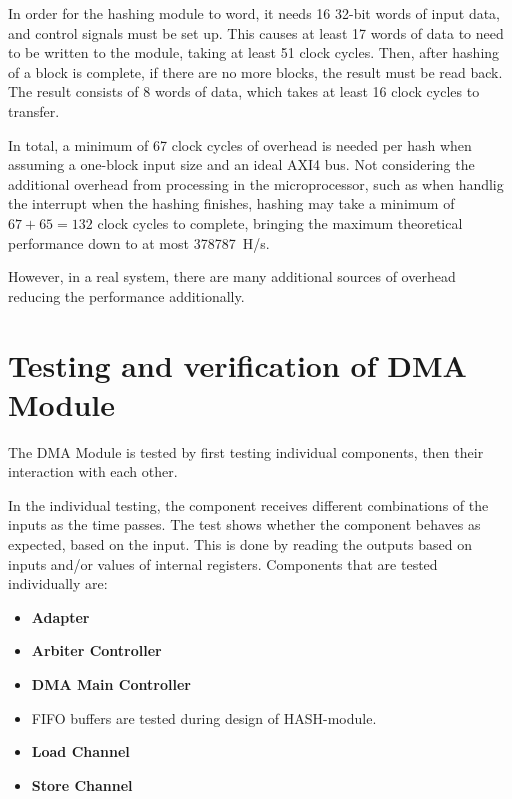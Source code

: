 In order for the hashing module to word, it needs 16 32-bit words of input data,
and control signals must be set up. This causes at least 17 words of data to
need to be written to the module, taking at least 51 clock cycles. Then, after
hashing of a block is complete, if there are no more blocks, the result must
be read back. The result consists of 8 words of data, which takes at least 16
clock cycles to transfer.

In total, a minimum of 67 clock cycles of overhead is needed per hash when assuming
a one-block input size and an ideal AXI4 bus. Not considering the additional overhead
from processing in the microprocessor, such as when handlig the interrupt when the
hashing finishes, hashing may take a minimum of $67 + 65 = 132$ clock cycles to
complete, bringing the maximum theoretical performance down to at most 378787~H/s.

However, in a real system, there are many additional sources of overhead reducing
the performance additionally.

\section{Testing and verification of DMA Module}
The DMA Module is tested by first testing individual components, then their interaction with each other.

In the individual testing, the component receives different combinations of the inputs as the time passes.
The test shows whether the component behaves as expected, based on the input.
This is done by reading the outputs based on inputs and/or values of internal registers.
Components that are tested individually are:
\begin{itemize}
    \item \textbf{Adapter} 
    \item \textbf{Arbiter Controller}
    \item \textbf{DMA Main Controller}
    \item {} FIFO buffers are tested during design of HASH-module. 
    \item \textbf{Load Channel}
    \item \textbf{Store Channel}
\end{itemize}

